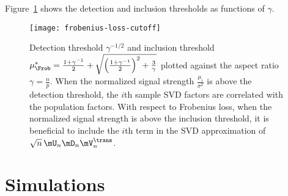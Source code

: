 Figure~\ref{F:frobenius-loss-cutoff} shows the detection and inclusion 
thresholds as functions of $\gamma$.

\begin{figure}[hbt]
    \centering
    \texttt{[image: frobenius-loss-cutoff]}
    \caption{
        Detection threshold $\gamma^{-1/2}$ and
        inclusion threshold
        \(
            \mu_\Frob^\ast
            =
            \frac{1 + \gamma^{-1}}{2}
            +
            \sqrt{
                \left( \frac{1 + \gamma^{-1} }{2} \right)^2
                +
                \frac{3}{\gamma}
            }
        \)
        plotted against the aspect ratio $\gamma = \frac{n}{p}$.  When
        the normalized signal strength $\frac{\mu_i}{\sigma^2}$ is above the 
        detection threshold, the $i$th sample SVD factors are correlated with
        the population factors.  With respect to Frobenius loss, when the 
        normalized signal strength is above the inclusion threshold, it is 
        beneficial to include the $i$th term in the SVD approximation of 
        $\sqrt{n} \, \mU_n \mD_n \mV_n^\trans$.
    }\label{F:frobenius-loss-cutoff}
\end{figure}

\clearpage

\section{Simulations}\label{S:intrinsic-loss-simulations}

